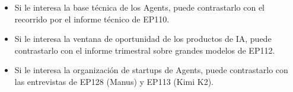 \begin{itemize}
\item Si le interesa la base técnica de los Agents, puede contrastarlo con el recorrido por el informe técnico de EP110.
\item Si le interesa la ventana de oportunidad de los productos de IA, puede contrastarlo con el informe trimestral sobre grandes modelos de EP112.
\item Si le interesa la organización de startups de Agents, puede contrastarlo con las entrevistas de EP128 (Manus) y EP113 (Kimi K2).
\end{itemize}


